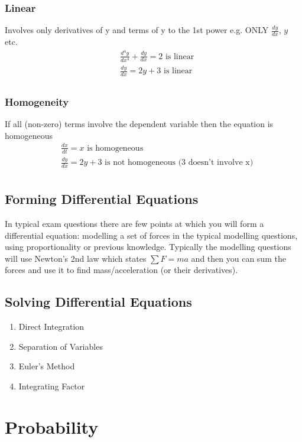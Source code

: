 \documentclass[12pt] {article}
\begin{document}
\subsubsection*{Linear}
Involves only derivatives of y and terms of y to the 1st power e.g. ONLY $\frac{dy}{dx}$, $y$ etc.
\begin{align*}
    &\frac{d^4y}{dx^4} + \frac{dy}{dx} = 2 \text{ is linear} \\
    &\frac{dy}{dx} = 2y + 3 \text{ is linear} \\
\end{align*}

\subsubsection*{Homogeneity} 
If all (non-zero) terms involve the dependent variable then the equation is homogeneous
\begin{align*}
    &\frac{dx}{dt} = x \text{ is homogeneous} \\
    &\frac{dy}{dx} = 2y + 3 \text{ is not homogeneous (3 doesn't involve x)} \\
\end{align*}

\subsection*{Forming Differential Equations}
In typical exam questions there are few points at which you will form a differential equation: modelling a set 
of forces in the typical modelling questions, using proportionality or previous knowledge. Typically the modelling 
questions will use Newton's 2nd law which states $\sum F = ma$ and then you can sum the forces and use it to find
mass/acceleration (or their derivatives). 

\subsection*{Solving Differential Equations}
\begin{enumerate} 
    \item Direct Integration
    \item Separation of Variables 
    \item Euler's Method    
    \item Integrating Factor
\end{enumerate}

\section{Probability}
\end{document}
